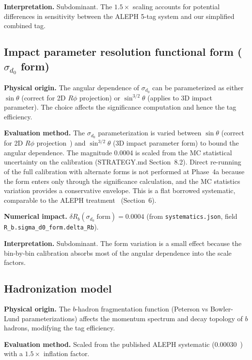 \documentclass[11pt,a4paper]{article}
\begin{document}
\textbf{Interpretation.} Subdominant. The $1.5\times$ scaling accounts for potential
differences in sensitivity between the ALEPH 5-tag system and our simplified combined tag.

\subsection{Impact parameter resolution functional form ($\sigma_{d_0}$ form)}
\label{sec:syst_sigma_d0_form}

\textbf{Physical origin.} The angular dependence of $\sigma_{d_0}$ can be parameterized
as either $\sin\theta$ (correct for 2D $R\phi$ projection) or $\sin^{3/2}\theta$
(applies to 3D impact parameter). The choice affects the significance computation
and hence the tag efficiency.

\textbf{Evaluation method.} The $\sigma_{d_0}$ parameterization is varied between
$\sin\theta$ (correct for 2D $R\phi$ projection~\cite{ALEPH:VDET}) and
$\sin^{3/2}\theta$ (3D impact parameter form) to bound the angular dependence.
The magnitude 0.0004 is scaled from the MC statistical uncertainty on the calibration
(STRATEGY.md Section~8.2). Direct re-running of the full calibration with alternate
forms is not performed at Phase~4a because the form enters only through the significance
calculation, and the MC statistics variation provides a conservative envelope. This is a
flat borrowed systematic, comparable to the ALEPH treatment~\cite{ALEPH:Rb:1996} (Section~6).

\textbf{Numerical impact.}
$\delta R_b(\sigma_{d_0}\;\mathrm{form}) = 0.0004$
(from \texttt{systematics.json}, field \texttt{R\_b.sigma\_d0\_form.delta\_Rb}).

\textbf{Interpretation.} Subdominant. The form variation is a small effect because
the bin-by-bin calibration absorbs most of the angular dependence into the scale factors.

\subsection{Hadronization model}
\label{sec:syst_hadronization}

\textbf{Physical origin.} The $b$-hadron fragmentation function (Peterson vs Bowler-Lund
parameterizations) affects the momentum spectrum and decay topology of $b$ hadrons,
modifying the tag efficiency.

\textbf{Evaluation method.} Scaled from the published ALEPH systematic
(0.00030~\cite{ALEPH:Rb:1996}) with a $1.5\times$ inflation factor.
\end{document}
